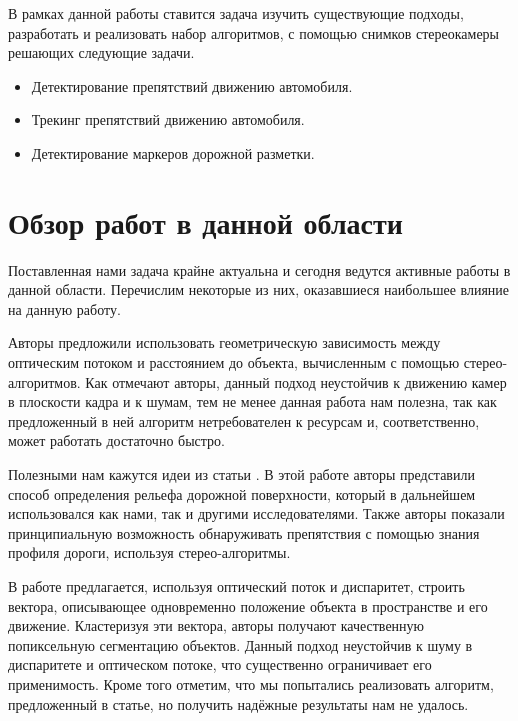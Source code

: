 \documentclass[aps,%
14pt,%
final,%
oneside,
onecolumn,%
musixtex, %
superscriptaddress,%
centertags]{extarticle} %
\begin{document}
В рамках данной работы ставится задача изучить существующие подходы, разработать и реализовать набор алгоритмов, с помощью снимков стереокамеры  решающих следующие задачи.
\begin{itemize}
    \item Детектирование препятствий движению автомобиля.
    \item Трекинг препятствий движению автомобиля.
    \item Детектирование маркеров дорожной разметки.
\end{itemize} 

\section{Обзор работ в данной области}










Поставленная нами задача крайне актуальна и сегодня ведутся активные работы в данной области. Перечислим некоторые из них, оказавшиеся наибольшее влияние на данную работу.

Авторы \cite{heinrich2002fast} предложили использовать геометрическую зависимость между оптическим потоком и расстоянием до объекта, вычисленным с помощью стерео-алгоритмов. Как отмечают авторы, данный подход неустойчив к движению камер в плоскости кадра и к шумам, тем не менее данная работа нам полезна, так как предложенный в ней алгоритм нетребователен к ресурсам и, соответственно, может работать достаточно быстро.

Полезными нам кажутся идеи из статьи \cite{labayrade2002real}. В этой работе авторы представили способ определения рельефа дорожной поверхности, который в дальнейшем использовался как нами, так и другими исследователями. Также авторы показали принципиальную возможность обнаруживать препятствия с помощью знания профиля дороги, используя стерео-алгоритмы.

В работе \cite{franke20056d} предлагается, используя оптический поток и диспаритет, строить вектора, описывающее одновременно положение объекта в пространстве и его движение. Кластеризуя эти вектора, авторы получают качественную попиксельную сегментацию объектов. Данный подход неустойчив к шуму в диспаритете и оптическом потоке, что существенно ограничивает его применимость. Кроме того отметим, что мы попытались реализовать алгоритм, предложенный в статье, но получить надёжные результаты нам не удалось.
\end{document}
